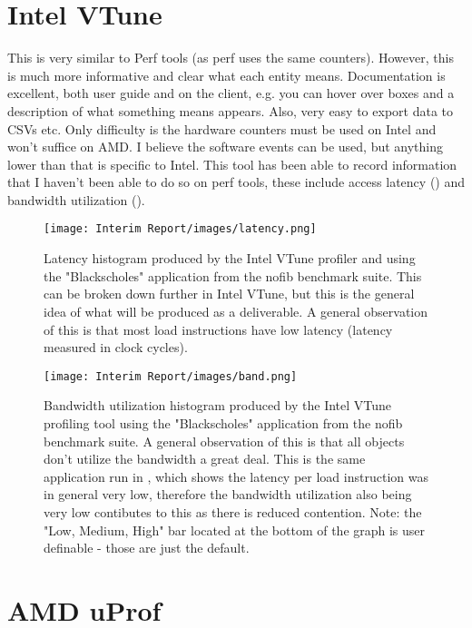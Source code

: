 \documentclass[a4paper,11pt]{article}
\begin{document}
\section{Intel VTune}

This is very similar to Perf tools (as perf uses the same counters). However, this is much more informative and clear what each entity means. Documentation is excellent, both user guide and on the client, e.g. you can hover over boxes and a description of what something means appears. Also, very easy to export data to CSVs etc. Only difficulty is the hardware counters must be used on Intel and won't suffice on AMD. I believe the software events can be used, but anything lower than that is specific to Intel. This tool has been able to record information that I haven't been able to do so on perf tools, these include access latency () and bandwidth utilization ().

\begin{figure}[!htb]
    \centering
    \texttt{[image: Interim Report/images/latency.png]}
    \caption{Latency histogram produced by the Intel VTune profiler and using the "Blackscholes" application from the nofib benchmark suite. This can be broken down further in Intel VTune, but this is the general idea of what will be produced as a deliverable. A general observation of this is that most load instructions have low latency (latency measured in clock cycles).}
    \label{fig:latency}
\end{figure}

\begin{figure}[!htb]
    \centering
    \texttt{[image: Interim Report/images/band.png]}
    \caption{Bandwidth utilization histogram produced by the Intel VTune profiling tool using the "Blackscholes" application from the nofib benchmark suite. A general observation of this is that all objects don't utilize the bandwidth a great deal. This is the same application run in , which shows the latency per load instruction was in general very low, therefore the bandwidth utilization also being very low contibutes to this as there is reduced contention. Note: the "Low, Medium, High" bar located at the bottom of the graph is user definable - those are just the default.}
    \label{fig:bandwidth}
\end{figure}

\section{AMD uProf}
\end{document}
